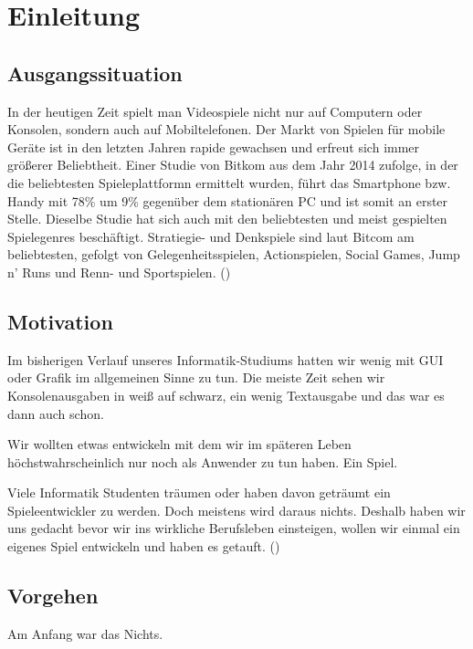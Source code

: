 \chapter{Einleitung}\label{ch:intro}

\section{Ausgangssituation}

In der heutigen Zeit spielt man Videospiele nicht nur auf Computern oder Konsolen, sondern auch auf Mobiltelefonen. Der Markt von Spielen für mobile Geräte ist in den letzten Jahren rapide gewachsen und erfreut sich immer größerer Beliebtheit. Einer Studie von Bitkom \cite{bitkomgaming} aus dem Jahr 2014 zufolge, in der die beliebtesten Spieleplattformn ermittelt wurden, führt das Smartphone bzw. Handy mit 78\% um 9\% gegenüber dem stationären PC und ist somit an erster Stelle. Dieselbe Studie hat sich auch mit den beliebtesten und meist gespielten Spielegenres beschäftigt. Stratiegie- und Denkspiele sind laut Bitcom am beliebtesten, gefolgt von Gelegenheitsspielen, Actionspielen, Social Games, Jump n' Runs und Renn- und Sportspielen.
()



\section{Motivation}

Im bisherigen Verlauf unseres Informatik-Studiums hatten wir wenig mit GUI oder Grafik im allgemeinen Sinne zu tun. Die meiste Zeit sehen wir Konsolenausgaben in weiß auf schwarz, ein wenig Textausgabe und das war es dann auch schon. 

Wir wollten etwas entwickeln mit dem wir im späteren Leben höchstwahrscheinlich nur noch als Anwender zu tun haben. Ein Spiel. 

Viele Informatik Studenten träumen oder haben davon geträumt ein Spieleentwickler zu werden. Doch meistens wird daraus nichts. Deshalb haben wir uns gedacht bevor wir ins wirkliche Berufsleben einsteigen, wollen wir einmal ein eigenes Spiel entwickeln und haben es \gamename getauft.
()

\section{Vorgehen}

Am Anfang war das Nichts.

